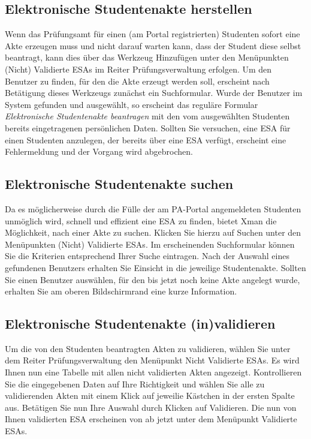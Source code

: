 \documentclass[a4paper,11pt]{article}
\newcommand{\knopf}[1]{{\sc #1}}
\begin{document}
\subsection{Elektronische Studentenakte herstellen}

Wenn das Prüfungsamt für einen (am Portal registrierten) Studenten sofort eine
Akte erzeugen muss und nicht darauf warten kann, dass der Student diese selbst
beantragt, kann dies über das Werkzeug \knopf{Hinzufügen} unter den
Menüpunkten \knopf{(Nicht) Validierte ESAs} im Reiter
\knopf{Prüfungsverwaltung} erfolgen. Um den Benutzer zu finden, für den die
Akte erzeugt werden soll, erscheint nach Betätigung dieses Werkzeugs zunächst
ein Suchformular. Wurde der Benutzer im System gefunden und ausgewählt, so
erscheint das reguläre Formular {\em Elektronische Studentenakte beantragen}
mit den vom ausgewählten Studenten bereits eingetragenen persönlichen Daten.
Sollten Sie versuchen, eine ESA für einen Studenten anzulegen, der bereits
über eine ESA verfügt, erscheint eine Fehlermeldung und der Vorgang wird
abgebrochen.

\subsection{Elektronische Studentenakte suchen}

Da es möglicherweise durch die Fülle der am PA-Portal angemeldeten Studenten
unmöglich wird, schnell und effizient eine ESA zu finden, bietet Xman die
Möglichkeit, nach einer Akte zu suchen. Klicken Sie hierzu auf \knopf{Suchen}
unter den Menüpunkten \knopf{(Nicht) Validierte ESAs}. Im erscheinenden
Suchformular können Sie die Kriterien entsprechend Ihrer Suche eintragen. Nach
der Auswahl eines gefundenen Benutzers erhalten Sie Einsicht in die jeweilige
Studentenakte. Sollten Sie einen Benutzer auswählen, für den bis jetzt noch
keine Akte angelegt wurde, erhalten Sie am oberen Bildschirmrand eine kurze
Information.

\subsection{Elektronische Studentenakte (in)validieren}

Um die von den Studenten beantragten Akten zu validieren, wählen Sie unter dem
Reiter \knopf{Prüfungsverwaltung} den Menüpunkt \knopf{Nicht Validierte ESAs}.
Es wird Ihnen nun eine Tabelle mit allen nicht validierten Akten angezeigt.
Kontrollieren Sie die eingegebenen Daten auf Ihre Richtigkeit und wählen Sie
alle zu validierenden Akten mit einem Klick auf jeweilie Kästchen in der
ersten Spalte aus. Betätigen Sie nun Ihre Auswahl durch Klicken auf
\knopf{Validieren}. Die nun von Ihnen validierten ESA erscheinen von ab jetzt
unter dem Menüpunkt \knopf{Validierte ESAs}.
\end{document}
